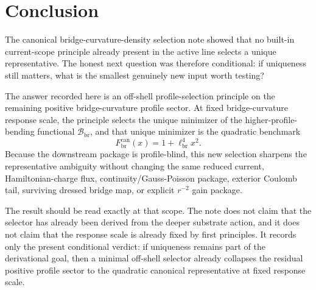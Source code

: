 \documentclass[11pt]{article}
\newcommand{\CurvScale}{\ell_{\mathrm{br}}}
\newcommand{\CurvProfileCan}{F_{\mathrm{br}}^{\mathrm{can}}}
\newcommand{\ProfBend}{\mathscr B_{\mathrm{br}}}
\begin{document}
\section{Conclusion}

The canonical bridge-curvature-density selection note showed that no built-in current-scope principle already present in the active line selects a unique representative. The honest next question was therefore conditional: if uniqueness still matters, what is the smallest genuinely new input worth testing?

The answer recorded here is an off-shell profile-selection principle on the remaining positive bridge-curvature profile sector. At fixed bridge-curvature response scale, the principle selects the unique minimizer of the higher-profile-bending functional \(\ProfBend\), and that unique minimizer is the quadratic benchmark
\[
\CurvProfileCan(x)=1+\CurvScale^4x^2.
\]
Because the downstream package is profile-blind, this new selection sharpens the representative ambiguity without changing the same reduced current, Hamiltonian-charge flux, continuity/Gauss-Poisson package, exterior Coulomb tail, surviving dressed bridge map, or explicit \(r^{-2}\) gain package.

The result should be read exactly at that scope. The note does not claim that the selector has already been derived from the deeper substrate action, and it does not claim that the response scale is already fixed by first principles. It records only the present conditional verdict: if uniqueness remains part of the derivational goal, then a minimal off-shell selector already collapses the residual positive profile sector to the quadratic canonical representative at fixed response scale.
\end{document}
